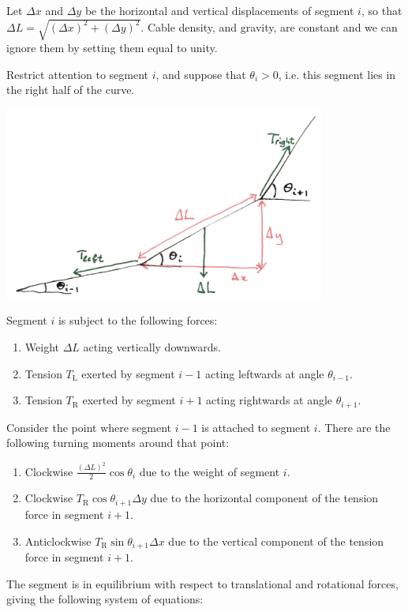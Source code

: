 \documentclass[12pt]{article}
\newcommand{\Tl}{T_{\text{L}}}
\newcommand{\Tr}{T_{\text{R}}}
\begin{document}
Let $\Delta x$ and $\Delta y$ be the horizontal and vertical displacements of segment $i$, so that
$\Delta L = \sqrt{(\Delta x)^2 + (\Delta y)^2}$. Cable density, and gravity, are constant and we
can ignore them by setting them equal to unity.

Restrict attention to segment $i$, and suppose that $\theta_i > 0$, i.e. this segment lies in the
right half of the curve.

\begin{mdframed}
\includegraphics[width=300pt]{img/misc--puzzles--hanging-cable.png}
\end{mdframed}


Segment $i$ is subject to the following forces:
\begin{enumerate}
\item Weight $\Delta L$ acting vertically downwards.
\item Tension $\Tl$ exerted by segment $i-1$ acting leftwards at angle $\theta_{i-1}$.
\item Tension $\Tr$ exerted by segment $i+1$ acting rightwards at angle $\theta_{i+1}$.
\end{enumerate}
Consider the point where segment $i-1$ is attached to segment $i$. There are the following turning
moments around that point:
\begin{enumerate}
\item Clockwise $\frac{(\Delta L)^2}{2}\cos\theta_i$ due to the weight of segment $i$.
\item Clockwise $\Tr\cos\theta_{i+1}\Delta y$ due to the horizontal component of the tension force
  in segment $i+1$.
\item Anticlockwise $\Tr\sin\theta_{i+1}\Delta x$ due to the vertical component of the tension
  force in segment $i+1$.
\end{enumerate}

The segment is in equilibrium with respect to translational and rotational forces, giving the
following system of equations:
\end{document}
